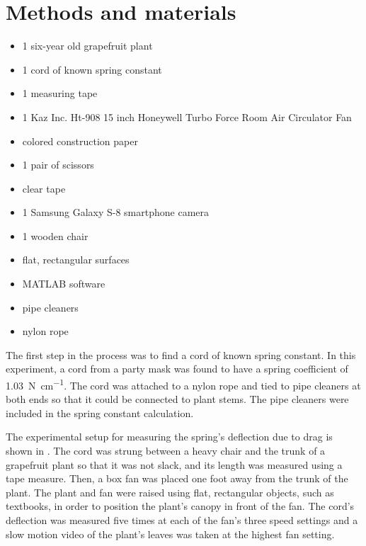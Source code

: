 \section{Methods and materials}
\begin{itemize}
\item 1 six-year old grapefruit plant
\item 1 cord of known spring constant
\item 1 measuring tape
\item 1 Kaz Inc. Ht-908 15 inch Honeywell Turbo Force Room Air Circulator Fan
\item colored construction paper
\item 1 pair of scissors
\item clear tape
\item 1 Samsung Galaxy S-8 smartphone camera
\item 1 wooden chair
\item flat, rectangular surfaces
\item MATLAB software
\item pipe cleaners
\item nylon rope
\end{itemize}

The first step in the process was to find a cord of known spring constant. In this experiment, a cord from a party mask was found to have a spring coefficient of \SI{1.03}{\newton\per\centi\meter}. The cord was attached to a nylon rope and tied to pipe cleaners at both ends so that it could be connected to plant stems. The pipe cleaners were included in the spring constant calculation.

The experimental setup for measuring the spring's deflection due to drag is shown in . The cord was strung between a heavy chair and the trunk of a grapefruit plant so that it was not slack, and its length was measured using a tape measure. Then, a box fan was placed one foot away from the trunk of the plant. The plant and fan were raised using flat, rectangular objects, such as textbooks, in order to position the plant's canopy in front of the fan. The cord's deflection was measured five times at each of the fan's three speed settings and a slow motion video of the plant's leaves was taken at the highest fan setting.

